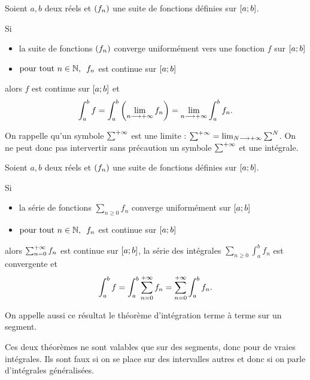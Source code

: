 \begin{cor}
Soient \(a,b\) deux réels et \(\left(f_n\right)\) une suite de fonctions définies sur \(\left[a;b\right]\).

Si

\begin{itemize}
    \item la suite de fonctions \(\left(f_n\right)\) converge uniformément vers une fonction \(f\) sur \(\left[a;b\right]\) \\
    \item \(\quantifs{\tpt n\in\N}f_n\) est continue sur \(\left[a;b\right]\)
\end{itemize}

alors \(f\) est continue sur \(\left[a;b\right]\) et \[\int_a^bf=\int_a^b\left(\lim_{n\longrightarrow+\infty}f_n\right)=\lim_{n\longrightarrow+\infty}\int_a^bf_n.\]
\end{cor}

On rappelle qu'un symbole \(\sum^{+\infty}\) est une limite : \(\sum^{+\infty}=\lim_{N\longrightarrow+\infty}\sum^N\). On ne peut donc pas intervertir sans précaution un symbole \(\sum^{+\infty}\) et une intégrale.

\begin{cor}
Soient \(a,b\) deux réels et \(\left(f_n\right)\) une suite de fonctions définies sur \(\left[a;b\right]\).

Si

\begin{itemize}
    \item la série de fonctions \(\sum_{n\geq0}f_n\) converge uniformément sur \(\left[a;b\right]\) \\
    \item \(\quantifs{\tpt n\in\N}f_n\) est continue sur \(\left[a;b\right]\)
\end{itemize}

alors \(\sum_{n=0}^{+\infty}f_n\) est continue sur \(\left[a;b\right]\), la série des intégrales \(\sum_{n\geq0}\int_a^bf_n\) est convergente et \[\int_a^bf=\int_a^b\sum_{n=0}^{+\infty}f_n=\sum_{n=0}^{+\infty}\int_a^bf_n.\]
\end{cor}

On appelle aussi ce résultat le théorème d'intégration terme à terme sur un segment.

\begin{rem}
Ces deux théorèmes ne sont valables que sur des segments, donc pour de vraies intégrales. Ils sont faux si on se place sur des intervalles autres et donc si on parle d'intégrales généralisées.
\end{rem}

